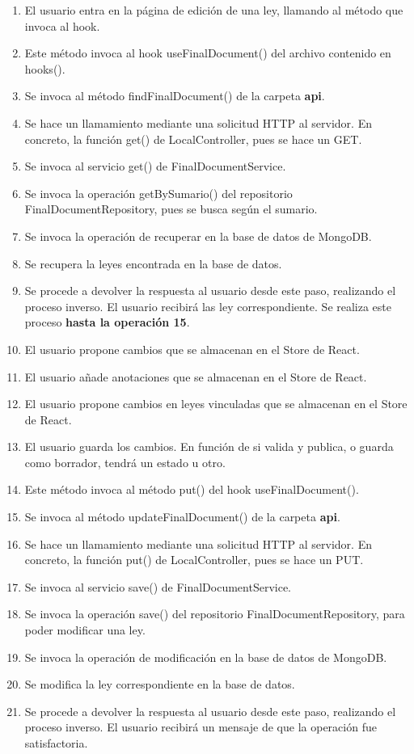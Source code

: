 \begin{enumerate}
    \item El usuario entra en la página de edición de una ley, llamando al método que invoca al hook.
    \item Este método invoca al hook useFinalDocument() del archivo contenido en hooks().
    \item Se invoca al método findFinalDocument() de la carpeta {\bf api}.
    \item Se hace un llamamiento mediante una solicitud HTTP al servidor. En concreto, la función get() de LocalController, pues se hace un GET.
    \item Se invoca al servicio get() de FinalDocumentService.
    \item Se invoca la operación getBySumario() del repositorio FinalDocumentRepository, pues se busca según el sumario.
    \item Se invoca la operación de recuperar en la base de datos de MongoDB.
    \item Se recupera la leyes encontrada en la base de datos.
    \item Se procede a devolver la respuesta al usuario desde este paso, realizando el proceso inverso. El usuario recibirá las ley correspondiente. Se realiza este proceso {\bf hasta la operación 15}.
    \item El usuario propone cambios que se almacenan en el Store de React.
    \item El usuario añade anotaciones que se almacenan en el Store de React.
    \item El usuario propone cambios en leyes vinculadas que se almacenan en el Store de React.
    \item El usuario guarda los cambios. En función de si valida y publica, o guarda como borrador, tendrá un estado u otro.
    \item Este método invoca al método put() del hook useFinalDocument().
    \item Se invoca al método updateFinalDocument() de la carpeta  {\bf api}.
    \item Se hace un llamamiento mediante una solicitud HTTP al servidor. En concreto, la función put() de LocalController, pues se hace un PUT.
    \item Se invoca al servicio save() de FinalDocumentService.
    \item Se invoca la operación save() del repositorio FinalDocumentRepository, para poder modificar una ley.
    \item Se invoca la operación de modificación en la base de datos de MongoDB.
    \item Se modifica la ley correspondiente en la base de datos.
    \item Se procede a devolver la respuesta al usuario desde este paso, realizando el proceso inverso. El usuario recibirá un mensaje de que la operación fue satisfactoria.
\end{enumerate}